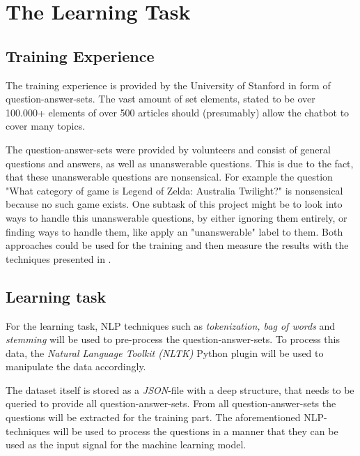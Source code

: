 \section{The Learning Task}
\label{sec:the-learning-task}

    
    \subsection{Training Experience}
    \label{subsec:-the-learning-task---training-experience}
        The training experience is provided by the University of Stanford in form of question-answer-sets.
        The vast amount of set elements, stated to be over 100.000+ elements of over 500 articles should (presumably) allow the chatbot to cover many topics.

        The question-answer-sets were provided by volunteers and consist of general questions and answers, as well as unanswerable questions.
        This is due to the fact, that these unanswerable questions are nonsensical.
        For example the question "What category of game is Legend of Zelda: Australia Twilight?" is nonsensical because no such game exists.
        One subtask of this project might be to look into ways to handle this unanswerable questions, by either ignoring them entirely, or finding ways to handle them, like apply an "unanswerable" label to them.
        Both approaches could be used for the training and then measure the results with the techniques presented in .
    
        
    \subsection{Learning task}
    \label{subsec:-the-learning-task---learning-task}
        For the learning task, NLP techniques such as \emph{tokenization, bag of words} and \emph{stemming} will be used to pre-process the question-answer-sets.
        To process this data, the \emph{Natural Language Toolkit (NLTK)} Python plugin will be used to manipulate the data accordingly.

        The dataset itself is stored as a \emph{JSON}-file with a deep structure, that needs to be queried to provide all question-answer-sets.
        From all question-answer-sets the questions will be extracted for the training part.
        The aforementioned NLP-techniques will be used to process the questions in a manner that they can be used as the input signal for the machine learning model.


